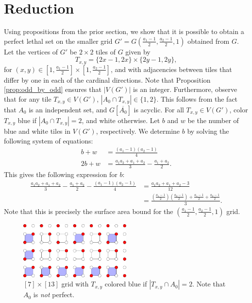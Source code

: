 \section{Reduction}
Using propositions from the prior section, we show that it is possible to obtain a perfect lethal set on the smaller grid $G' = G(\frac{a_1-1}{2}, \frac{a_2-1}{2}, 1)$ obtained from $G$. Let the vertices of $G'$ be $2 \times 2$ tiles of $G$ given by
$$T_{x,y} = \{2x-1,2x\} \times \{2y-1, 2y\},$$
for $(x,y) \in [1, \tfrac{a_1-1}{2}] \times [1, \tfrac{a_2-1}{2}]$, and with adjacencies between tiles that differ by one in each of the cardinal directions. Note that Proposition \ref{prop:odd_by_odd} ensures that $|V(G')|$ is an integer. Furthermore, observe that for any tile $T_{x,y} \in V(G')$, $|A_0 \cap T_{x,y}| \in \{1,2\}$. This follows from the fact that $A_0$ is an independent set, and $G[\overline{A_0}]$ is acyclic. For all $T_{x,y} \in V(G')$, color $T_{x,y}$ blue if $|A_0 \cap T_{x,y}| = 2$, and white otherwise. Let $b$ and $w$ be the number of blue and white tiles in $V(G')$, respectively. We determine $b$ by solving the following system of equations:
\begin{align*}
b + w &= \frac{(a_1-1)(a_2-1)}{4} \\
2b + w &= \frac{a_1a_2+a_1+a_2}{3} - \frac{a_1+a_2}{2}.
\end{align*}
This gives the following expression for $b$:
\begin{align}
\frac{a_1a_2+a_1+a_2}{3} - \frac{a_1+a_2}{2} - \frac{(a_1-1)(a_2-1)}{4} &= \frac{a_1a_2+a_1+a_2-3}{12} \label{eq:tile_bound_1} \\
&= \frac{(\frac{a_1-1}{2})(\frac{a_2-1}{2}) + \frac{a_1-1}{2} + \frac{a_2-1}{2}}{3} \label{eq:tile_bound_2}.
\end{align}
Note that this is precisely the surface area bound for the $(\frac{a_1-1}{2}, \frac{a_2-1}{2}, 1)$ grid. %

\begin{figure}[]
\centering
\includegraphics[width=0.5\textwidth]{figures/6/tiles.pdf}
\caption{$[7] \times [13]$ grid with $T_{x,y}$ colored blue if $|T_{x,y} \cap A_0| = 2$. Note that $A_0$ is \emph{not} perfect.}
\label{fig:tiles}
\end{figure} 

